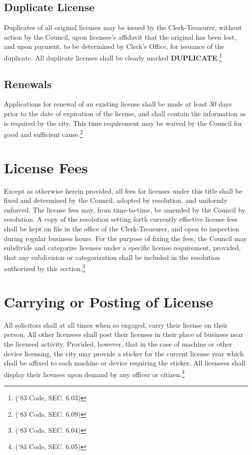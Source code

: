\subsection{Duplicate License}
Duplicates of all original licenses may be issued by the Clerk-Treasurer, without action by the Council, upon licensee’s affidavit that the original has been lost, and upon payment, to be determined by Clerk’s Office, for issuance of the duplicate.  All duplicate licenses shall be clearly marked \textbf{DUPLICATE}.\footnote{(‘83 Code, SEC. 6.03)}
\subsection{Renewals}
Applications for renewal of an existing license shall be made at least 30 days prior to the date of expiration of the license, and shall contain the information as is required by the city.  This time requirement may be waived by the Council for good and sufficient cause.\footnote{(‘83 Code, SEC. 6.09)}

\section{License Fees}
Except as otherwise herein provided, all fees for licenses under this title shall be fixed and determined by the Council, adopted by resolution, and uniformly enforced.  The license fees may, from time-to-time, be amended by the Council by resolution.  A copy of the resolution setting forth currently effective license fees shall be kept on file in the office of the Clerk-Treasurer, and open to inspection during regular business hours.  For the purpose of fixing the fees, the Council may subdivide and categorize licenses under a specific license requirement, provided, that any subdivision or categorization shall be included in the resolution authorized by this section.\footnote{(‘83 Code, SEC. 6.04)}

\section{Carrying or Posting of License}
All solicitors shall at all times when so engaged, carry their license on their person.  All other licensees shall post their licenses in their place of business near the licensed activity.  Provided, however, that in the case of machine or other device licensing, the city may provide a sticker for the current license year which shall be affixed to each machine or device requiring the sticker.  All licensees shall display their licenses upon demand by any officer or citizen.\footnote{(‘83 Code, SEC. 6.05)}

